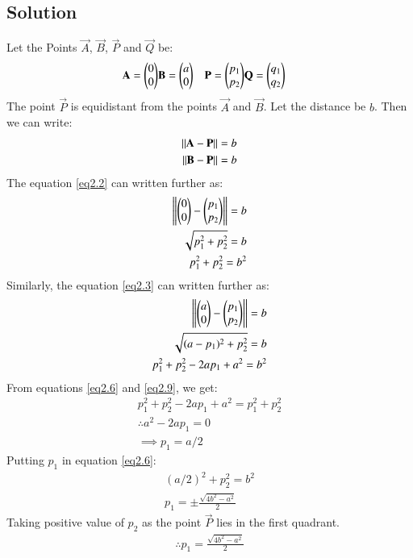 \documentclass[journal,12pt,twocolumn]{IEEEtran}
\begin{document}
\subsection{Solution}
Let the Points $\vec{A}$, $\vec{B}$, $\vec{P}$ and $\vec{Q}$ be:
\begin{align}
    \mathbf{A}=\begin{pmatrix}0 \\ 0\end{pmatrix} & \mathbf{B}=\begin{pmatrix}a \\ 0\end{pmatrix} & \mathbf{P}=\begin{pmatrix}p_1 \\ p_2\end{pmatrix}&\mathbf{Q}=\begin{pmatrix}q_1 \\ q_2\end{pmatrix}
\end{align}
The point $\vec{P}$ is equidistant from the points $\vec{A}$ and $\vec{B}$. Let the distance be $b$. Then we can write:
\begin{align}
    \left\lVert\mathbf{A}-\mathbf{P}\right\rVert=b \label{eq2.2}\\
    \left\lVert\mathbf{B}-\mathbf{P}\right\rVert=b \label{eq2.3}
\end{align}
The equation \ref{eq2.2} can written further as:
\begin{align}
    \left\lVert\begin{pmatrix}0\\0\end{pmatrix}-\begin{pmatrix}p_1\\p_2\end{pmatrix}\right\rVert=b \\
    \sqrt{p_1^2+p_2^2}=b\\
    p_1^2+p_2^2=b^2 \label{eq2.6}
\end{align}
Similarly, the equation \ref{eq2.3} can written further as:
\begin{align}
    \left\lVert\begin{pmatrix}a\\0\end{pmatrix}-\begin{pmatrix}p_1\\p_2\end{pmatrix}\right\rVert=b \\
    \sqrt{(a-p_1)^2+p_2^2}=b\\
    p_1^2+p_2^2-2ap_1+a^2=b^2 \label{eq2.9}
\end{align}
From equations \ref{eq2.6} and \ref{eq2.9}, we get:
\begin{align}
    p_1^2+p_2^2-2ap_1+a^2=p_1^2+p_2^2\\
    \therefore a^2-2ap_1=0\\
    \implies p_1=a/2
\end{align}
Putting $p_1$ in equation \ref{eq2.6}:
\begin{align}
   (a/2)^2+p_2^2=b^2 \\
    p_1=\pm \frac{\sqrt{4b^2-a^2}}{2}
\end{align}
Taking positive value of $p_2$ as the point $\vec{P}$ lies in the first quadrant.
\begin{align}
    \therefore p_1=\frac{\sqrt{4b^2-a^2}}{2}
\end{align}
\end{document}
